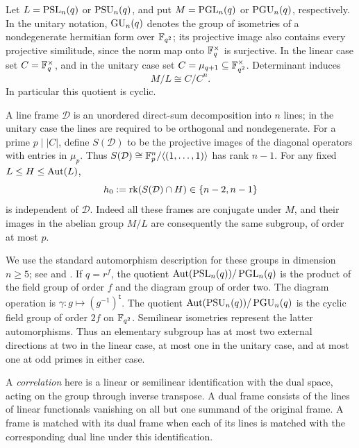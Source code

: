 Let $L=\operatorname{PSL}_n(q)$ or $\operatorname{PSU}_n(q)$, and put $M=\operatorname{PGL}_n(q)$ or
$\operatorname{PGU}_n(q)$, respectively.  In the unitary notation, $\operatorname{GU}_n(q)$ denotes
the group of isometries of a nondegenerate hermitian form over
$\mathbb F_{q^2}$; its projective image also contains every projective
similitude, since the norm map onto $\mathbb F_q^\times$ is surjective.
In the linear case set $C=\mathbb F_q^\times$, and in the unitary case set
$C=\mu_{q+1}\subseteq\mathbb F_{q^2}^\times$.  Determinant induces
\begin{equation}\label{eq:linear-determinant}
 M/L\cong C/C^n.
\end{equation}
In particular this quotient is cyclic.

A line frame $\mathcal D$ is an unordered direct-sum decomposition into
$n$ lines; in the unitary case the lines are required to be orthogonal
and nondegenerate.  For a prime $p\mid |C|$, define $S(\mathcal D)$ to
be the projective images of the diagonal operators with entries in
$\mu_p$.  Thus $S(\mathcal D)\cong\mathbb F_p^n/\langle(1,\ldots,1)\rangle$
has rank $n-1$.  For any fixed $L\le H\le\operatorname{Aut}(L)$,
\begin{equation}\label{eq:linear-hzero}
 h_0:=\operatorname{rk}(S(\mathcal D)\cap H)\in\{n-2,n-1\}
\end{equation}
is independent of $\mathcal D$.  Indeed all these frames are conjugate
under $M$, and their images in the abelian group $M/L$ are consequently
the same subgroup, of order at most $p$.

We use the standard automorphism description for these groups in
dimension $n\ge5$; see \citet[Section~2 and statements~3.2--3.6]{Steinberg1960}
and \citet{GLS1998}.  If $q=r^f$, the quotient
$\operatorname{Aut}(\operatorname{PSL}_n(q))/\operatorname{PGL}_n(q)$ is the product of the field group of order
$f$ and the diagram group of order two.  The diagram operation is
$\gamma:g\mapsto(g^{-1})^{\mathsf t}$.  The quotient
$\operatorname{Aut}(\operatorname{PSU}_n(q))/\operatorname{PGU}_n(q)$ is the cyclic field group of order $2f$
on $\mathbb F_{q^2}$.  Semilinear isometries represent the latter automorphisms.
Thus an elementary subgroup has at most two external directions at two
in the linear case, at most one in the unitary case, and at most one
at odd primes in either case.

A \emph{correlation} here is a linear or semilinear identification
with the dual space, acting on the group through inverse transpose.
A dual frame consists of the lines of linear functionals vanishing
on all but one summand of the original frame.
A frame is matched with its dual frame when each of its lines is
matched with the corresponding dual line under this identification.

